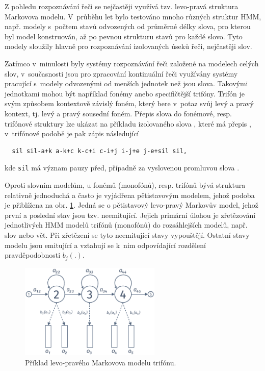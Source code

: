 Z pohledu rozpoznávání řeči se nejčastěji využívá tzv. levo-pravá struktura Markovova modelu. V~průběhu let bylo testováno mnoho různých struktur HMM, např. modely s~počtem stavů odvozených od průměrné délky slova, pro kterou byl model konstruován, až po pevnou strukturu stavů pro každé slovo. Tyto modely sloužily hlavně pro rozpoznávání izolovaných úseků řeči, nejčastěji slov.

Zatímco v~minulosti byly systémy rozpoznávání řeči založené na modelech celých slov, v~současnosti jsou pro zpracování kontinuální řeči využívány systémy pracující s~modely odvozenými od menších jednotek než jsou slova.
Takovými jednotkami mohou být například fonémy anebo specifičtější trifóny. Trifón je svým způsobem kontextově závislý foném, který bere v~potaz svůj levý a pravý kontext, tj. levý a pravý sousední foném. Přepis slova do fonémové, resp. trifónové struktury lze ukázat na příkladu izolovaného slova , které má přepis , v~trifónové podobě je pak zápis následující

\begin{verbatim}
  sil sil-a+k a-k+c k-c+i c-i+j i-j+e j-e+sil sil,
\end{verbatim}

\noindent kde \texttt{sil} má význam pauzy před, případně za vyslovenou promluvou slova .

Oproti slovním modelům, u fonémů (monofónů), resp. trifónů bývá struktura relativně jednoduchá a často je vyjádřena pětistavovým modelem, jehož podoba je přiblížena na obr. \ref{fig:asr:acoustic:hmm}. Jedná se o pětistavový levo-pravý Markovův model, jehož první a poslední stav jsou tzv. neemitující. Jejich primární úlohou je zřetězování jednotlivých HMM modelů trifónů (monofónů) do rozsáhlejších modelů, např. slov nebo vět. Při zřetězení se tyto neemitující stavy vypouštějí. Ostatní stavy modelu jsou emitující a vztahují se  k~nim odpovídající rozdělení pravděpodobnosti $b_j(.)$.

\begin{figure}[hbpt]
  \centering
  \includegraphics[width=0.6\textwidth]{./ch4-asr/img/hmm_structure.pdf}
  \caption{Příklad levo-pravého Markovova modelu trifónu.}
  \label{fig:asr:acoustic:hmm}
\end{figure}

